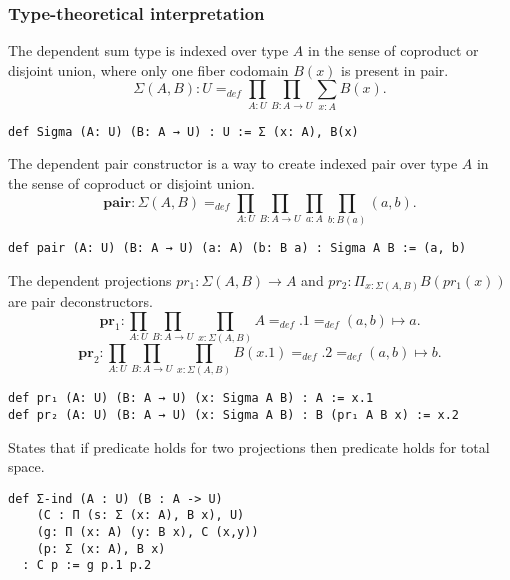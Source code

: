 \documentclass{article}
\begin{document}
\subsubsection*{Type-theoretical interpretation}

\begin{definition}
The dependent sum type is indexed over type $A$ in the sense of coproduct or disjoint union,
where only one fiber codomain $B(x)$ is present in pair.
$$
   \Sigma(A,B) : U =_{def} \prod_{A:U}\prod_{B: A \rightarrow U }\sum_{x:A} B(x).
$$
\begin{lstlisting}[mathescape=true]
def Sigma (A: U) (B: A → U) : U := Σ (x: A), B(x)
\end{lstlisting}
\end{definition}

\begin{definition} 
The dependent pair constructor is a way to create indexed pair over type $A$
in the sense of coproduct or disjoint union.
$$
  \mathbf{pair} : \Sigma(A,B) =_{def} \prod_{A:U}\prod_{B:A \rightarrow U}\prod_{a:A}\prod_{b:B(a)} (a,b).
$$
\begin{lstlisting}
def pair (A: U) (B: A → U) (a: A) (b: B a) : Sigma A B := (a, b)
\end{lstlisting}
\end{definition}

\begin{definition} 
The dependent projections
$pr_{1}: \Sigma(A,B) \rightarrow A$ and
$pr_{2}: \Pi_{x: \Sigma(A,B)} B(pr_{1}(x))$ are pair deconstructors.
$$
  \mathbf{pr}_1 : \prod_{A:U} \prod_{B:A \rightarrow U} \prod_{x: \Sigma(A,B)} A
  =_{def} .1 =_{def} (a,b) \mapsto a.
$$
$$
  \mathbf{pr}_2 : \prod_{A:U} \prod_{B:A \rightarrow U} \prod_{x: \Sigma(A,B)} B(x.1)
  =_{def} .2 =_{def} (a,b) \mapsto b.
$$
\begin{lstlisting}[mathescape=true]
def pr₁ (A: U) (B: A → U) (x: Sigma A B) : A := x.1
def pr₂ (A: U) (B: A → U) (x: Sigma A B) : B (pr₁ A B x) := x.2
\end{lstlisting}
\end{definition}

\begin{definition} 
States that if predicate holds for two projections
then predicate holds for total space.
\begin{lstlisting}[mathescape=true]
def Σ-ind (A : U) (B : A -> U)
    (C : Π (s: Σ (x: A), B x), U)
    (g: Π (x: A) (y: B x), C (x,y))
    (p: Σ (x: A), B x)
  : C p := g p.1 p.2
\end{lstlisting}
\end{definition}
\end{document}
